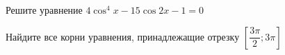 \begin{ex}
	\begin{condition}
		\begin{enumcols}[label=\asbuk*)]
			\item Решите уравнение \( 4\cos^4 x - 15\cos 2x -1= 0 \)
			\item Найдите все корни уравнения, принадлежащие отрезку \( \left[\dfrac{3\pi}{2};3\pi\right] \)
		\end{enumcols}
	\end{condition}
\end{ex}